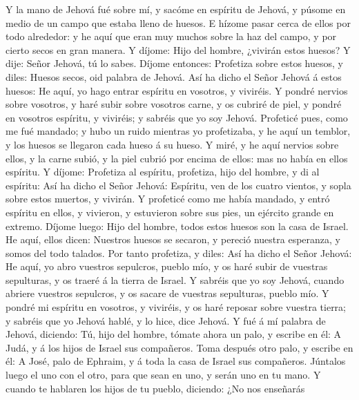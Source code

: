  Y la mano de Jehová fué sobre mí, y sacóme en espíritu de
Jehová, y púsome en medio de un campo que estaba lleno de huesos.
 E hízome pasar cerca de ellos por todo alrededor: y he
aquí que eran muy muchos sobre la haz del campo, y por cierto secos en
gran manera.  Y díjome: Hijo del hombre, ¿vivirán estos
huesos? Y dije: Señor Jehová, tú lo sabes.  Díjome
entonces: Profetiza sobre estos huesos, y diles: Huesos secos, oid
palabra de Jehová.  Así ha dicho el Señor Jehová á estos
huesos: He aquí, yo hago entrar espíritu en vosotros, y viviréis.
 Y pondré nervios sobre vosotros, y haré subir sobre
vosotros carne, y os cubriré de piel, y pondré en vosotros espíritu, y
viviréis; y sabréis que yo soy Jehová.  Profeticé pues,
como me fué mandado; y hubo un ruido mientras yo profetizaba, y he aquí
un temblor, y los huesos se llegaron cada hueso á su hueso.
 Y miré, y he aquí nervios sobre ellos, y la carne subió,
y la piel cubrió por encima de ellos: mas no había en ellos espíritu.
 Y díjome: Profetiza al espíritu, profetiza, hijo del
hombre, y di al espíritu: Así ha dicho el Señor Jehová: Espíritu, ven de
los cuatro vientos, y sopla sobre estos muertos, y vivirán.
 Y profeticé como me había mandado, y entró espíritu en
ellos, y vivieron, y estuvieron sobre sus pies, un ejército grande en
extremo.  Díjome luego: Hijo del hombre, todos estos
huesos son la casa de Israel. He aquí, ellos dicen: Nuestros huesos se
secaron, y pereció nuestra esperanza, y somos del todo talados.
 Por tanto profetiza, y diles: Así ha dicho el Señor
Jehová: He aquí, yo abro vuestros sepulcros, pueblo mío, y os haré subir
de vuestras sepulturas, y os traeré á la tierra de Israel.
 Y sabréis que yo soy Jehová, cuando abriere vuestros
sepulcros, y os sacare de vuestras sepulturas, pueblo mío.
 Y pondré mi espíritu en vosotros, y viviréis, y os haré
reposar sobre vuestra tierra; y sabréis que yo Jehová hablé, y lo hice,
dice Jehová.  Y fué á mí palabra de Jehová, diciendo:
 Tú, hijo del hombre, tómate ahora un palo, y escribe en
él: A Judá, y á los hijos de Israel sus compañeros. Toma después otro
palo, y escribe en él: A José, palo de Ephraim, y á toda la casa de
Israel sus compañeros.  Júntalos luego el uno con el
otro, para que sean en uno, y serán uno en tu mano.  Y
cuando te hablaren los hijos de tu pueblo, diciendo: ¿No nos enseñarás
